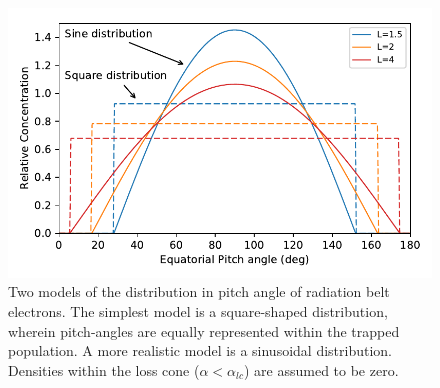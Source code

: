 \begin{figure}
\begin{center}
\includegraphics{figures/pitch-angle_distributions.pdf}
\caption[Pitch-angle distribution functions]{Two models of the distribution in pitch angle of radiation belt electrons. The simplest model is a square-shaped distribution, wherein pitch-angles are equally represented within the trapped population. A more realistic model is a sinusoidal distribution. Densities within the loss cone ($\alpha < \alpha_{lc}$) are assumed to be zero.}
\label{fig:pitchangledistributions}
\end{center}
\end{figure}

